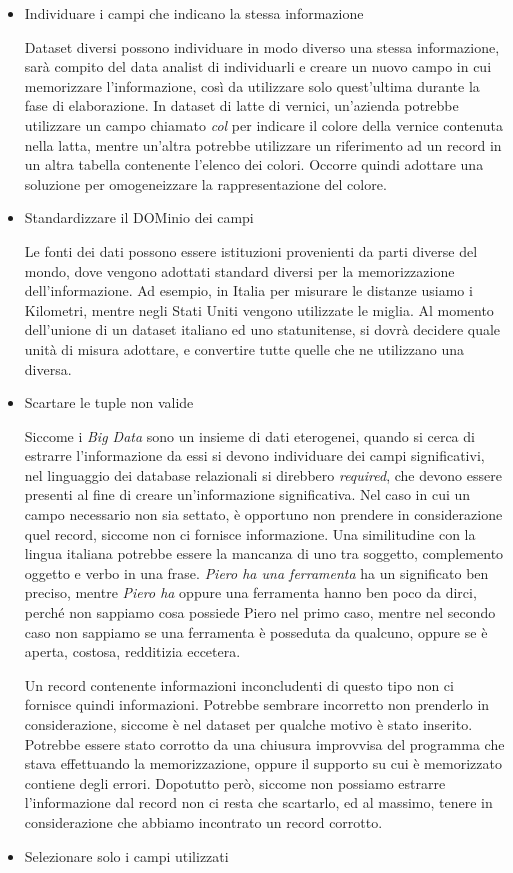 \begin{itemize}
\item Individuare i campi che indicano la stessa informazione

Dataset diversi possono individuare in modo diverso una stessa informazione, sarà compito del data analist di individuarli e creare un nuovo campo in cui memorizzare l'informazione, così da utilizzare solo quest'ultima durante la fase di elaborazione. In dataset di latte di vernici, un'azienda potrebbe utilizzare un campo chiamato \emph{col} per indicare il colore della vernice contenuta nella latta, mentre un'altra potrebbe utilizzare un riferimento ad un record in un altra tabella contenente l'elenco dei colori. Occorre quindi adottare una soluzione per omogeneizzare la rappresentazione del colore.

\item Standardizzare il DOMinio dei campi

Le fonti dei dati possono essere istituzioni provenienti da parti diverse del mondo, dove vengono adottati standard diversi per la memorizzazione dell'informazione. Ad esempio, in Italia per misurare le distanze usiamo i Kilometri, mentre negli Stati Uniti vengono utilizzate le miglia. Al momento dell'unione di un dataset italiano ed uno statunitense, si dovrà decidere quale unità di misura adottare, e convertire tutte quelle che ne utilizzano una diversa.
\item Scartare le tuple non valide

Siccome i \emph{Big Data} sono un insieme di dati eterogenei, quando si cerca di estrarre l'informazione da essi si devono individuare dei campi significativi, nel linguaggio dei database relazionali si direbbero \emph{required}, che devono essere presenti al fine di creare un'informazione significativa. Nel caso in cui un campo necessario non sia settato, è opportuno non prendere in considerazione quel record, siccome non ci fornisce informazione. Una similitudine con la lingua italiana potrebbe essere la mancanza di uno tra soggetto, complemento oggetto e verbo in una frase. \emph{Piero ha una ferramenta} ha un significato ben preciso, mentre \emph{Piero ha} oppure {una ferramenta} hanno ben poco da dirci, perché non sappiamo cosa possiede Piero nel primo caso, mentre nel secondo caso non sappiamo se una ferramenta è posseduta da qualcuno, oppure se è aperta, costosa, redditizia eccetera. 

Un record contenente informazioni inconcludenti di questo tipo non ci fornisce quindi informazioni. Potrebbe sembrare incorretto non prenderlo in considerazione, siccome è nel dataset per qualche motivo è stato inserito. Potrebbe essere stato corrotto da una chiusura improvvisa del programma che stava effettuando la memorizzazione, oppure il supporto su cui è memorizzato contiene degli errori. Dopotutto però, siccome non possiamo estrarre l'informazione dal record non ci resta che scartarlo, ed al massimo, tenere in considerazione che abbiamo incontrato un record corrotto.
\item Selezionare solo i campi utilizzati


\end{itemize}
